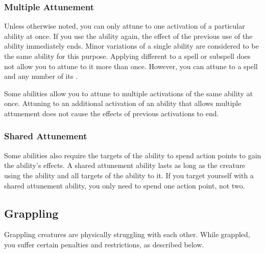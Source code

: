         \subsubsection{Multiple Attunement}\label{Multiple Attunement}
            Unless otherwise noted, you can only attune to one activation of a particular ability at once.
            If you use the ability again, the effect of the previous use of the ability immediately ends.
            Minor variations of a single ability are considered to be the same ability for this purpose.
            Applying different  to a spell or subspell does not allow you to attune to it more than once.
            However, you can attune to a spell and any number of its .

            Some abilities allow you to attune to multiple activations of the same ability at once.
            Attuning to an additional activation of an ability that allows multiple attunement does not cause the effects of previous activations to end.

        \subsubsection{Shared Attunement}\label{Shared Attunement}
            Some abilities also require the targets of the ability to spend action points to gain the ability's effects.
            A shared attunement ability lasts as long as the creature using the ability and all targets of the ability  to it.
            If you target yourself with a shared attunement ability, you only need to spend one action point, not two.

    \subsection{Grappling}\label{Grappling}
        Grappling creatures are physically struggling with each other. While grappled, you suffer certain penalties and restrictions, as described below.

